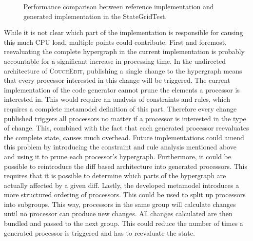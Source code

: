 \begin{figure}
  \centering
  \caption{Performance comparison between reference implementation and generated implementation in the StateGridTest.}
  \label{fig:performance}
\end{figure}

While it is not clear which part of the implementation is responsible for causing this much CPU load, multiple points could contribute. First and foremost, reevaluating the complete hypergraph in the current implementation is probably accountable for a significant increase in processing time. In the undirected architecture of \textsc{CouchEdit}, publishing a single change to the hypergraph means that every processor interested in this change will be triggered. The current implementation of the code generator cannot prune the elements a processor is interested in.  This would require an analysis of constraints and rules, which requires a complete metamodel definition of this part. Therefore every change published triggers all processors no matter if a processor is interested in the type of change. This, combined with the fact that each generated processor reevaluates the complete state, causes much overhead. Future implementations could amend this problem by introducing the constraint and rule analysis mentioned above and using it to prune each processor's hypergraph. Furthermore, it could be possible to reintroduce the diff based architecture into generated processors. This requires that it is possible to determine which parts of the hypergraph are actually affected by a given diff. Lastly, the developed metamodel introduces a more structured ordering of processors. This could be used to split up processors into subgroups. This way, processors in the same group will calculate changes until no processor can produce new changes. All changes calculated are then bundled and passed to the next group. This could reduce the number of times a generated processor is triggered and has to reevaluate the state.

